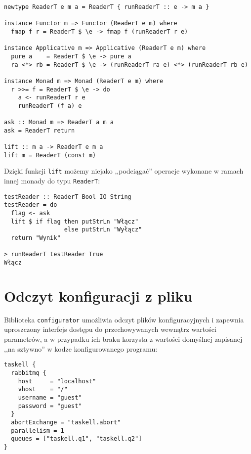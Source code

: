 \begin{lstlisting}[caption=Transformator typu Reader]
newtype ReaderT e m a = ReaderT { runReaderT :: e -> m a }

instance Functor m => Functor (ReaderT e m) where
  fmap f r = ReaderT $ \e -> fmap f (runReaderT r e)

instance Applicative m => Applicative (ReaderT e m) where
  pure a    = ReaderT $ \e -> pure a
  ra <*> rb = ReaderT $ \e -> (runReaderT ra e) <*> (runReaderT rb e)

instance Monad m => Monad (ReaderT e m) where 
  r >>= f = ReaderT $ \e -> do
    a <- runReaderT r e
    runReaderT (f a) e

ask :: Monad m => ReaderT a m a
ask = ReaderT return

lift :: m a -> ReaderT e m a
lift m = ReaderT (const m)
\end{lstlisting}
Dzięki funkcji \lstinline{lift} możemy niejako ,,podciągać'' operacje wykonane w ramach innej monady do typu \lstinline{ReaderT}:

\begin{lstlisting}
testReader :: ReaderT Bool IO String
testReader = do
  flag <- ask 
  lift $ if flag then putStrLn "Włącz"
                 else putStrLn "Wyłącz"
  return "Wynik"

> runReaderT testReader True
Włącz
\end{lstlisting}

\newpage
\section{Odczyt konfiguracji z pliku}
Biblioteka \texttt{configurator}\cite{Conf} umożliwia odczyt plików konfiguracyjnych i zapewnia uproszczony interfejs dostępu do przechowywanych wewnątrz wartości parametrów, a w przypadku ich braku korzysta z wartości domyślnej zapisanej ,,na sztywno'' w kodze konfigurowanego programu:
\begin{lstlisting}[caption=Przykładowy plik konfiguracyjny]
taskell {
  rabbitmq {
    host     = "localhost"
    vhost    = "/"
    username = "guest"
    password = "guest"
  }
  abortExchange = "taskell.abort"
  parallelism = 1
  queues = ["taskell.q1", "taskell.q2"]
}
\end{lstlisting}

